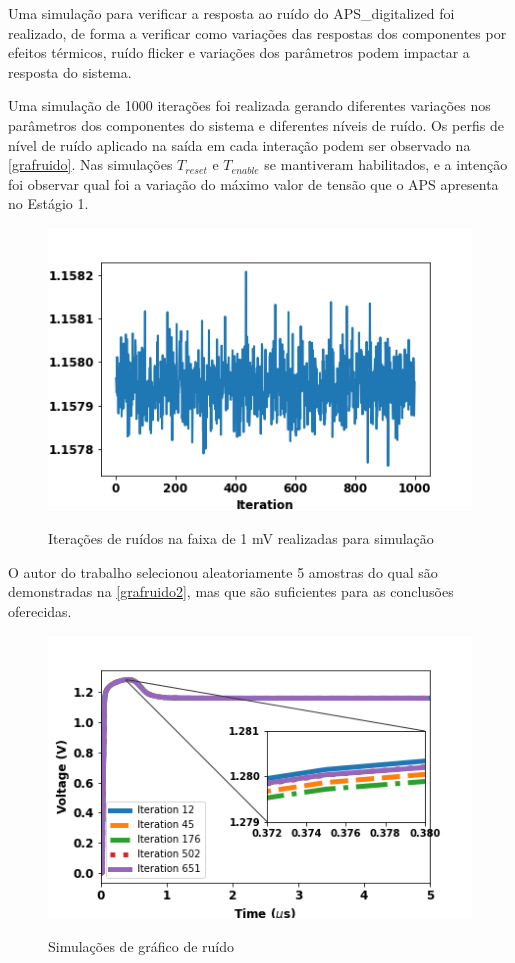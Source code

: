 Uma simulação para verificar a resposta ao ruído do APS\_digitalized foi realizado, de forma a verificar como variações das respostas dos componentes por efeitos térmicos, ruído flicker e variações dos parâmetros podem impactar a resposta do sistema.

Uma simulação de 1000 iterações foi realizada gerando diferentes variações nos parâmetros dos componentes do sistema e diferentes níveis de ruído. Os perfis de nível de ruído aplicado na saída em cada interação podem ser observado na \autoref{grafruido}. Nas simulações $T_{reset}$ e $T_{enable}$ se mantiveram habilitados, e a intenção foi observar qual foi a variação do máximo valor de tensão que o APS apresenta no Estágio 1.

\begin{figure}[!h]
 \centering
    \caption{Iterações de ruídos na faixa de 1 mV realizadas para simulação} 
    \includegraphics[scale=0.6]{Resultados/Graficos/ruido-Vout_noise.png}
    \label{grafruido}
\end{figure}

O autor do trabalho selecionou aleatoriamente 5 amostras do qual são demonstradas na \autoref{grafruido2}, mas que são suficientes para as conclusões oferecidas.

\begin{figure}[!h]
 \centering
    \caption{Simulações de gráfico de ruído} 
    \includegraphics[scale=0.8]{Resultados/Graficos/tb_pixel_TRAN_NOISE.png}
    \label{grafruido2}
\end{figure}

